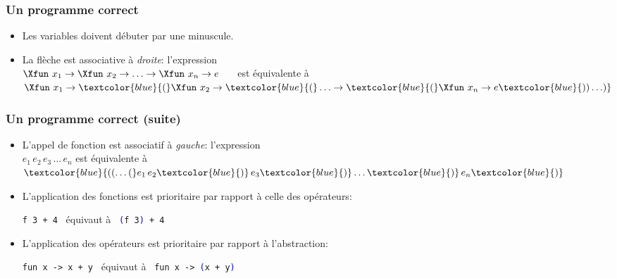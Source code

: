 %
\begin{frame}
\frametitle{Un programme correct}

{\small
{}




}

\bigskip

\remarques

\begin{itemize}

  \item Les variables doivent débuter par une minuscule.

  \item La flèche est associative à \emph{droite}: l'expression\\
  $\Xfun \,\, x_1 \rightarrow \Xfun \,\, x_2 \rightarrow \ldots
  \rightarrow \Xfun \,\, x_n \rightarrow e$ \ \ \ est équivalente à\\
  $\Xfun \,\, x_1 \rightarrow \textcolor{blue}{(}\Xfun \,\, x_2 \rightarrow
  \textcolor{blue}{(}\ldots \rightarrow \textcolor{blue}{(}\Xfun \,\, x_n \rightarrow
  e\textcolor{blue}{)) \ldots)}$

\end{itemize}

\end{frame}

%
\begin{frame}
\frametitle{Un programme correct (suite)}

\begin{itemize}

  \item L'appel de fonction est associatif à \emph{gauche}:
  l'expression\\ $e_1 \, e_2 \, e_3 \, \ldots \, e_n$ est équivalente
  à $\textcolor{blue}{((\ldots (}e_1 \, e_2\textcolor{blue}{)} \, e_3\textcolor{blue}{)} \ldots
  \textcolor{blue}{)} \, e_n\textcolor{blue}{)}$

  \item L'application des fonctions est prioritaire par rapport à
  celle des opérateurs:
  \begin{center}
    \texttt{f 3 + 4} \ équivaut à \ \texttt{\textcolor{blue}{(}f 3\textcolor{blue}{)} +
    4}
  \end{center}

  \item L'application des opérateurs est prioritaire par rapport à
  l'abstraction:
  \begin{center} 
    \texttt{fun x -> x + y} \ équivaut à \ \texttt{fun x ->
    \textcolor{blue}{(}x + y\textcolor{blue}{)}}
  \end{center}

\end{itemize}

\end{frame}

